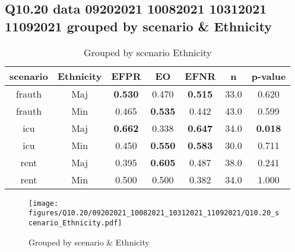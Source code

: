 \subsection{Q10.20 data 09202021 10082021 10312021 11092021 grouped by scenario \& Ethnicity}

\begin{comment}
                   EFPR        EO      EFNR     n    pvalue
(frauth, Maj)  0.530303  0.469697  0.515152  33.0  0.620400
(frauth, Min)  0.465116  0.534884  0.441860  43.0  0.599073
(icu, Maj)     0.661765  0.338235  0.647059  34.0  0.018443
(icu, Min)     0.450000  0.550000  0.583333  30.0  0.711365
(rent, Maj)    0.394737  0.605263  0.486842  38.0  0.241129
(rent, Min)    0.500000  0.500000  0.382353  34.0  1.000000
\end{comment}

\begin{table}[h]
    \centering
    \begin{tabular}{|c|c|c|c|c|c|c|}
        \hline
        scenario & Ethnicity & EFPR & EO & EFNR & n & p-value\\
        \hline
        frauth & Maj & \textbf{0.530} & 0.470 & \textbf{0.515} & 33.0 & 0.620\\
		frauth & Min & 0.465 & \textbf{0.535} & 0.442 & 43.0 & 0.599\\
		icu & Maj & \textbf{0.662} & 0.338 & \textbf{0.647} & 34.0 & \textbf{0.018}\\
		icu & Min & 0.450 & \textbf{0.550} & \textbf{0.583} & 30.0 & 0.711\\
		rent & Maj & 0.395 & \textbf{0.605} & 0.487 & 38.0 & 0.241\\
		rent & Min & 0.500 & 0.500 & 0.382 & 34.0 & 1.000\\
		
        \hline
    \end{tabular}
    \caption{Grouped by scenario Ethnicity}
    \label{tab:my_label}
\end{table}
\begin{figure}[h]
    \centering
    \texttt{[image: figures/Q10.20/09202021\_10082021\_10312021\_11092021/Q10.20\_scenario\_Ethnicity.pdf]}
    \caption{Grouped by scenario \& Ethnicity}
    \label{fig:my_label}
\end{figure}
